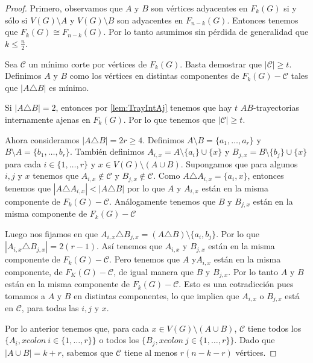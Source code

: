 \begin{proof}
Primero, observamos que $A$ y $B$ son v\'ertices adyacentes en $F_k(G)$ si y
s\'olo si $V(G) \setminus A$ y $V(G)\setminus B$ son adyacentes en $F_{n-k}(G)$.
Entonces tenemos que $F_k(G) \cong F_{n-k}(G)$. Por lo tanto asumimos sin
p\'erdida de generalidad que $k \leq \frac{n}{2}$.

Sea $\mathcal{C}$ un m\'inimo corte por v\'ertices de $F_k(G)$. Basta
demostrar que $|\mathcal{C}| \geq t$. Definimos $A$ y $B$ como los v\'ertices en
distintas componentes de $F_k(G)- \mathcal{C}$ tales que $|A \triangle B|$ es
m\'inimo.

Si $|A \triangle B| = 2$, entonces por \cref{lem:TrayIntAj}
tenemos que hay $t$ $AB$-trayectorias internamente ajenas en $F_k(G)$. Por lo
que tenemos que $|\mathcal{C}| \geq t$.

Ahora consideramos $|A \triangle B| = 2r \geq 4$. Definimos $A \setminus B
=\{a_1, \dots, a_r\}$ y $B \setminus A =\{b_1, \dots, b_r\}$. Tambi\'en
definimos $A_{i,x} = A\setminus \{a_i\} \cup \{x\}$ y $B_{j,x} = B\setminus
\{b_j\} \cup \{x\}$ para cada $i \in \{1, \dots, r\}$ y $x \in V(G)\setminus
(A\cup B)$. Supongamos que para algunos $i, j$ y $x$ tenemos que $A_{i,x} \notin
\mathcal{C}$ y $B_{j,x} \notin \mathcal{C}$. Como $A \triangle A_{i,x} = \{a_i,
x\}$, entonces tenemos que $|A \triangle A_{i,x}|< |A \triangle B|$ por lo que
$A$ y $A_{i,x}$ est\'an en la misma componente de $F_k(G)- \mathcal{C}$.
An\'alogamente tenemos que  $B$ y $B_{j,x}$ est\'an en la misma componente de
$F_k(G)-\mathcal{C}$

Luego nos fijamos en que $A_{i,x} \triangle B_{j,x} = (A \triangle B) \setminus
\{a_i, b_j\}$. Por lo que $|A_{i,x} \triangle B_{j,x}| = 2(r-1)$. As\'i
tenemos que $A_{i,x}$ y $B_{j,x}$ est\'an en la misma componente de $F_k(G)-
\mathcal{C}$. Pero tenemos que $A$ y$A_{i,x}$ est\'an en la misma componente, de
$F_K(G) - \mathcal{C}$, de igual manera que $B$ y $B_{j,x}$. Por lo tanto $A$ y
$B$ est\'an en la misma componente de $F_k(G)- \mathcal{C}$. Esto es una
cotradicci\'on pues tomamos a $A$ y $B$ en distintas componentes, lo que implica
que $A_{i,x}$ o $B_{j,x}$ est\'a en $\mathcal{C}$, para todas las $i,j$ y $x$.

Por lo anterior tenemos que, para cada $x \in V(G)\setminus (A \cup B)$,
$\mathcal{C}$ tiene todos los $\{A_i,x colon\ i \in \{1, \dots, r\}\}$ o todos los
$\{B_j,x colon\ j \in \{1, \dots, r\}\}$. Dado que $|A\cup B|=k +r$, sabemos que
$\mathcal{C}$ tiene al menos $r(n-k-r)$ v\'ertices.


\end{proof}
